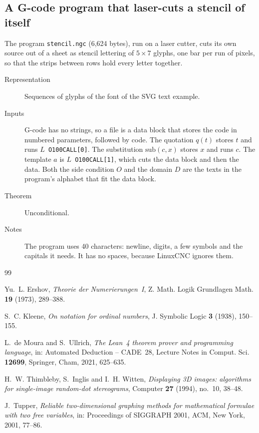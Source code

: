\documentclass[11pt]{amsart}
\theoremstyle{definition}
\theoremstyle{remark}
\newcommand{\sub}{\mathrm{sub}}
\newcommand{\lean}[1]{\texttt{#1}}
\begin{document}
\subsection{A G-code program that laser-cuts a stencil of itself}
The program \lean{stencil.ngc} (6,624 bytes), run on a laser cutter, cuts its own source out of a
sheet as stencil lettering of $5 \times 7$ glyphs, one bar per run of pixels, so that the strips
between rows hold every letter together.
\begin{description}
\item[Representation] Sequences of glyphs of the font of the SVG text example.
\item[Inputs] G-code has no strings, so a file is a data block that stores the code in numbered
parameters, followed by code. The quotation $q(t)$ stores $t$ and runs $L$\verb| O100CALL[0]|. The
substitution $\sub(c,x)$ stores $x$ and runs $c$. The template $a$ is $L$\verb| O100CALL[1]|, which
cuts the data block and then the data. Both the side condition $O$ and the domain $D$ are the texts
in the program's alphabet that fit the data block.
\item[Theorem] Unconditional.
\item[Notes] The program uses 40 characters: newline, digits, a few symbols and the capitals it
needs. It has no spaces, because LinuxCNC ignores them.
\end{description}

\begin{thebibliography}{99}

Yu.~L. Ershov,
\emph{Theorie der Numerierungen~I},
Z. Math. Logik Grundlagen Math. \textbf{19} (1973), 289--388.

S.~C. Kleene,
\emph{On notation for ordinal numbers},
J. Symbolic Logic \textbf{3} (1938), 150--155.

L.~de Moura and S.~Ullrich,
\emph{The Lean~4 theorem prover and programming language},
in: Automated Deduction -- CADE~28,
Lecture Notes in Comput. Sci. \textbf{12699}, Springer, Cham, 2021, 625--635.

H.~W. Thimbleby, S.~Inglis and I.~H. Witten,
\emph{Displaying 3D images: algorithms for single-image random-dot stereograms},
Computer \textbf{27} (1994), no.~10, 38--48.

J.~Tupper,
\emph{Reliable two-dimensional graphing methods for mathematical formulae with two free
variables},
in: Proceedings of SIGGRAPH 2001, ACM, New York, 2001, 77--86.

\end{thebibliography}
\end{document}
